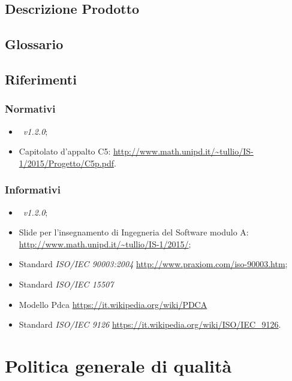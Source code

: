 \documentclass[12pt,a4paper]{article}
\begin{document}
\subsection{Descrizione Prodotto}
\descrizioneProdotto

\subsection{Glossario}
\glossarioPrint

\subsection{Riferimenti}

\subsubsection{Normativi}
\begin{itemize}
	\item \NdP\ \textit{v1.2.0};
	\item Capitolato d'appalto C5: \url{http://www.math.unipd.it/~tullio/IS-1/2015/Progetto/C5p.pdf}.
\end{itemize}

\subsubsection{Informativi}
\begin{itemize}
	\item \PdP\ \textit{v1.2.0};
	\item Slide per l'insegnamento di Ingegneria del Software modulo A: \url{http://www.math.unipd.it/~tullio/IS-1/2015/};
	\item Standard \textit{ISO/IEC 90003:2004} \url{http://www.praxiom.com/iso-90003.htm};
	\item Standard \textit{ISO/IEC 15507} 
	\item Modello Pdca \url{https://it.wikipedia.org/wiki/PDCA}
	\item Standard \textit{ISO/IEC 9126} \url{https://it.wikipedia.org/wiki/ISO/IEC_9126}.
\end{itemize}

\newpage

\section{Politica generale di qualità}
\end{document}
